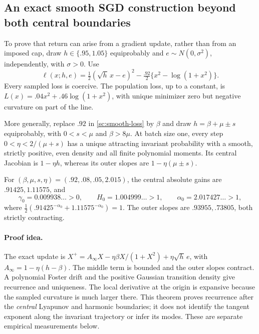 \subsection{An exact smooth SGD construction beyond both central boundaries}
To prove that return can arise from a gradient update, rather than from
an imposed cap, draw \(h\in\{.95,1.05\}\) equiprobably and
\(e\sim N(0,\sigma^2)\), independently, with \(\sigma>0\). Use
\begin{equation}
 \ell(x;h,e)=\tfrac12(\sqrt h\,x-e)^2
 -\tfrac{.92}{2}\{x^2-\log(1+x^2)\}.
 \label{sc:smooth-loss}
\end{equation}
Every sampled loss is coercive. The population loss, up to a constant, is
\(L(x)=.04x^2+.46\log(1+x^2)\), with unique minimizer zero but negative
curvature on part of the line.

\begin{theorem}
\label{sc:nonlinear-recurrence}
More generally, replace \(.92\) in \eqref{sc:smooth-loss} by \(\beta\)
and draw \(h=\beta+\mu\pm s\) equiprobably, with
\(0<s<\mu\) and \(\beta>8\mu\). At batch size one, every step
\(0<\eta<2/(\mu+s)\) has a unique attracting invariant probability
with a smooth, strictly positive, even density and all finite polynomial
moments. Its central Jacobian is \(1-\eta h\), whereas its outer slopes
are \(1-\eta(\mu\pm s)\).

For \((\beta,\mu,s,\eta)=(.92,.08,.05,2.015)\), the central absolute
gains are \(.91425,1.11575\), and
\begin{equation}
 \gamma_0=0.009938\ldots>0,\qquad
 H_0=1.004999\ldots>1,\qquad \alpha_0=2.017427\ldots>1,
 \label{sc:concrete-numbers}
\end{equation}
where \(\tfrac12(.91425^{-\alpha_0}+1.11575^{-\alpha_0})=1\).
The outer slopes are \(.93955,.73805\), both strictly contracting.
\end{theorem}

\paragraph{Proof idea.}
The exact update is
\(X^+=A_\infty X-\eta\beta X/(1+X^2)+\eta\sqrt h\,e\), with
\(A_\infty=1-\eta(h-\beta)\). The middle term is bounded and the outer
slopes contract. A polynomial Foster drift and the positive Gaussian
transition density give recurrence and uniqueness. The local derivative
at the origin is expansive because the sampled curvature is much larger
there. This theorem proves recurrence after the \emph{central} Lyapunov
and harmonic boundaries; it does not identify the tangent exponent along
the invariant trajectory or infer its modes. These are separate empirical
measurements below.
